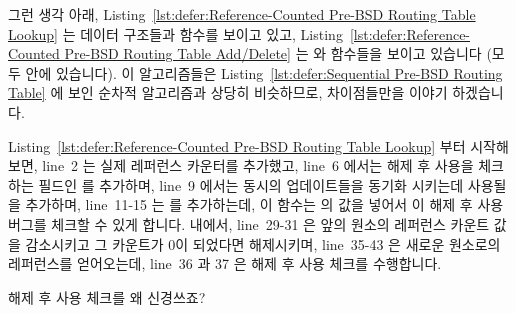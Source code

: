 그런 생각 아래,
Listing~\ref{lst:defer:Reference-Counted Pre-BSD Routing Table Lookup}
는 데이터 구조들과  함수를 보이고 있고,
Listing~\ref{lst:defer:Reference-Counted Pre-BSD Routing Table Add/Delete}
는  와  함수들을 보이고 있습니다 (모두
 안에 있습니다).
이 알고리즘들은
Listing~\ref{lst:defer:Sequential Pre-BSD Routing Table} 에 보인 순차적
알고리즘과 상당히 비슷하므로, 차이점들만을 이야기 하겠습니다.

Listing~\ref{lst:defer:Reference-Counted Pre-BSD Routing Table Lookup} 부터
시작해 보면, line~2 는 실제 레퍼런스 카운터를 추가했고, line~6 에서는 해제 후
사용을 체크하는 필드인  를 추가하며, line~9 에서는 동시의
업데이트들을 동기화 시키는데 사용될  을 추가하며, line~11-15 는
 를 추가하는데, 이 함수는  의 값을 넣어서
 이 해제 후 사용 버그를 체크할 수 있게 합니다.
 내에서, line~29-31 은 앞의 원소의 레퍼런스 카운트 값을
감소시키고 그 카운트가 0이 되었다면 해제시키며, line~35-43 은 새로운 원소로의
레퍼런스를 얻어오는데, line~36 과 37 은 해제 후 사용 체크를 수행합니다.

\QuickQuiz{}
	해제 후 사용 체크를 왜 신경쓰죠?
	\iffalse

